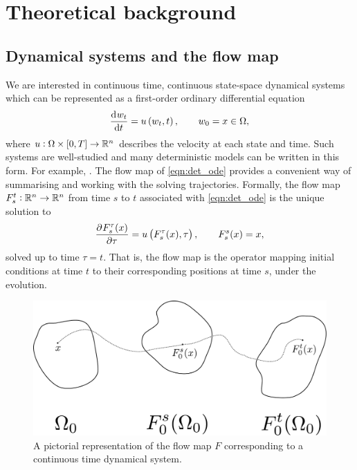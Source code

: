 \chapter{Theoretical background}
\section{Dynamical systems and the flow map}
We are interested in continuous time, continuous state-space dynamical systems which can be represented as a first-order ordinary differential equation
\begin{equation}
	\dod{w_t}{t} = u\left(w_t, t\right), \qquad w_0 = x \in \Omega,
	\label{eqn:det_ode}
\end{equation}
where \(u: \Omega \times[0,T] \to \mathbb{R}^n\) describes the velocity at each state and time.
Such systems are well-studied and many deterministic models can be written in this form.
For example, \citehere.
The flow map of \eqref{eqn:det_ode} provides a convenient way of summarising and working with the solving trajectories.
Formally, the flow map \(F_{s}^{t}: \mathbb{R}^n \to \mathbb{R}^n\) from time \(s\) to \(t\) associated with \eqref{eqn:det_ode} is the unique solution to
\begin{equation}
	\dpd{F_{s}^{\tau}(x)}{\tau} = u\left(F_{s}^\tau(x), \tau\right), \qquad F_{s}^{s}(x) = x,
	\label{eqn:flow_map_ode}
\end{equation}
solved up to time \(\tau = t\).
That is, the flow map is the operator mapping initial conditions at time \(t\) to their corresponding positions at time \(s\), under the evolution.

\begin{figure}
	\begin{center}
		\includegraphics[width=\textwidth]{chp02_background/figures/flow_map.pdf}
		\caption{A pictorial representation of the flow map \(F\) corresponding to a continuous time dynamical system.}
		\label{fig:flow_map_diag}
	\end{center}
\end{figure}

